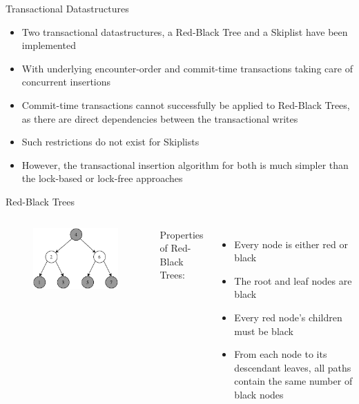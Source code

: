\begin{frame}{Transactional Datastructures}
\begin{itemize}
    \item<1-> Two transactional datastructures, a Red-Black Tree and a Skiplist have been implemented
    \item<2-> With underlying encounter-order and commit-time transactions taking care of concurrent insertions
    \item<3-> Commit-time transactions cannot successfully be applied to Red-Black Trees, as there are direct dependencies between the transactional writes
    \item<4-> Such restrictions do not exist for Skiplists
    \item<5-> However, the transactional insertion algorithm for both is much simpler than the lock-based or lock-free approaches
\end{itemize}
\end{frame}

\begin{frame}{Red-Black Trees}
\begin{columns}
\begin{figure}
    \centering
    \includegraphics[height=0.5\textheight]{images/rbt.pdf}
\end{figure}

Properties of Red-Black Trees:
\begin{itemize}
    \item Every node is either red or black
    \item The root and leaf nodes are black
    \item Every red node's children must be black
    \item From each node to its descendant leaves, all paths contain the same number of black nodes
\end{itemize}
\end{columns}
\end{frame}


